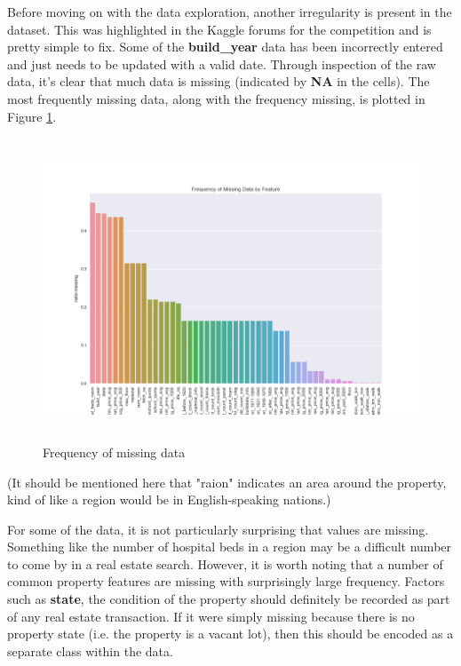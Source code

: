 \documentclass[12pt]{article}
\theoremstyle{plain} %
\theoremstyle{definition} %
\theoremstyle{remark} %
\begin{document}
Before moving on with the data exploration, another irregularity is present in the dataset.  This was highlighted in the Kaggle forums for the competition and is pretty simple to fix.  Some of the \textbf{build\_year} data has been incorrectly entered and just needs to be updated with a valid date.  Through inspection of the raw data, it's clear that much data is missing (indicated by \textbf{NA} in the cells).  The most frequently missing data, along with the frequency missing, is plotted in Figure \ref{fig:six}.

\begin{figure}[h!]
\begin{center}
\includegraphics[width=18cm,height=9cm]{./output_images/missing_frequency.png}
\caption{Frequency of missing data}
\label{fig:six}
\end{center}
\end{figure}

(It should be mentioned here that "raion" indicates an area around the property, kind of like a region would be in English-speaking nations.)

For some of the data, it is not particularly surprising that values are missing.  Something like the number of hospital beds in a region may be a difficult number to come by in a real estate search.  However, it is worth noting that a number of common property features are missing with surprisingly large frequency.  Factors such as \textbf{state}, the condition of the property should definitely be recorded as part of any real estate transaction.  If it were simply missing because there is no property state (i.e. the property is a vacant lot), then this should be encoded as a separate class within the data.
\end{document}
